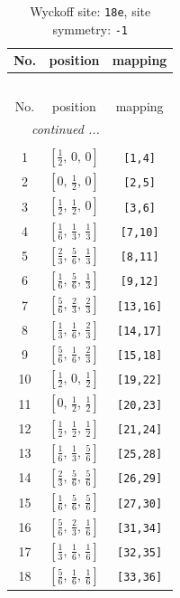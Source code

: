 \documentclass[fleqn,8pt]{jsarticle}
\begin{document}
\renewcommand{\arraystretch}{1.2}
\begin{longtable}{ccc}
\caption{Wyckoff site: {\tt 18e}, site symmetry: {\tt -1}}
 \\
 \hline \hline
No. & position & mapping \\ \hline \endfirsthead

\multicolumn{2}{l}{\tablename\ \thetable{}} \\
 \hline \hline
No. & position & mapping \\ \hline \endhead

 \hline \hline
\multicolumn{2}{r}{\footnotesize\it continued ...} \\ \endfoot

 \hline \hline
\multicolumn{2}{r}{} \\ \endlastfoot

1 & $\left[ \frac{1}{2},\, 0,\, 0 \right]$ & {\tt [1,4]} \\ \hline
2 & $\left[ 0,\, \frac{1}{2},\, 0 \right]$ & {\tt [2,5]} \\ \hline
3 & $\left[ \frac{1}{2},\, \frac{1}{2},\, 0 \right]$ & {\tt [3,6]} \\ \hline
4 & $\left[ \frac{1}{6},\, \frac{1}{3},\, \frac{1}{3} \right]$ & {\tt [7,10]} \\ \hline
5 & $\left[ \frac{2}{3},\, \frac{5}{6},\, \frac{1}{3} \right]$ & {\tt [8,11]} \\ \hline
6 & $\left[ \frac{1}{6},\, \frac{5}{6},\, \frac{1}{3} \right]$ & {\tt [9,12]} \\ \hline
7 & $\left[ \frac{5}{6},\, \frac{2}{3},\, \frac{2}{3} \right]$ & {\tt [13,16]} \\ \hline
8 & $\left[ \frac{1}{3},\, \frac{1}{6},\, \frac{2}{3} \right]$ & {\tt [14,17]} \\ \hline
9 & $\left[ \frac{5}{6},\, \frac{1}{6},\, \frac{2}{3} \right]$ & {\tt [15,18]} \\ \hline
10 & $\left[ \frac{1}{2},\, 0,\, \frac{1}{2} \right]$ & {\tt [19,22]} \\ \hline
11 & $\left[ 0,\, \frac{1}{2},\, \frac{1}{2} \right]$ & {\tt [20,23]} \\ \hline
12 & $\left[ \frac{1}{2},\, \frac{1}{2},\, \frac{1}{2} \right]$ & {\tt [21,24]} \\ \hline
13 & $\left[ \frac{1}{6},\, \frac{1}{3},\, \frac{5}{6} \right]$ & {\tt [25,28]} \\ \hline
14 & $\left[ \frac{2}{3},\, \frac{5}{6},\, \frac{5}{6} \right]$ & {\tt [26,29]} \\ \hline
15 & $\left[ \frac{1}{6},\, \frac{5}{6},\, \frac{5}{6} \right]$ & {\tt [27,30]} \\ \hline
16 & $\left[ \frac{5}{6},\, \frac{2}{3},\, \frac{1}{6} \right]$ & {\tt [31,34]} \\ \hline
17 & $\left[ \frac{1}{3},\, \frac{1}{6},\, \frac{1}{6} \right]$ & {\tt [32,35]} \\ \hline
18 & $\left[ \frac{5}{6},\, \frac{1}{6},\, \frac{1}{6} \right]$ & {\tt [33,36]} \\
\end{longtable}
\end{document}
